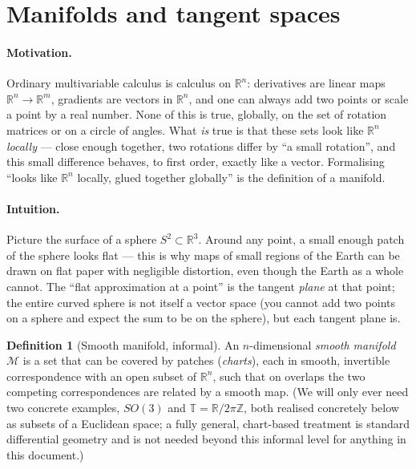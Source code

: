 \documentclass[11pt,a4paper]{report}
\theoremstyle{definition}
\newtheorem{definition}[definition]{Definition}
\theoremstyle{remark}
\newcommand{\RR}{\mathbb R}
\newcommand{\ZZ}{\mathbb Z}
\begin{document}
\section{Manifolds and tangent spaces}
\label{sec:manifolds-scratch}

\paragraph{Motivation.} Ordinary multivariable calculus is calculus on
$\RR^n$: derivatives are linear maps $\RR^n\to\RR^m$, gradients are vectors
in $\RR^n$, and one can always add two points or scale a point by a real
number. None of this is true, globally, on the set of rotation matrices or
on a circle of angles. What \emph{is} true is that these sets look like
$\RR^n$ \emph{locally} --- close enough together, two rotations differ by
``a small rotation'', and this small difference behaves, to first order,
exactly like a vector. Formalising ``looks like $\RR^n$ locally, glued
together globally'' is the definition of a manifold.

\paragraph{Intuition.} Picture the surface of a sphere $S^2\subset\RR^3$.
Around any point, a small enough patch of the sphere looks flat --- this is
why maps of small regions of the Earth can be drawn on flat paper with
negligible distortion, even though the Earth as a whole cannot. The
``flat approximation at a point'' is the tangent \emph{plane} at that point;
the entire curved sphere is not itself a vector space (you cannot add two
points on a sphere and expect the sum to be on the sphere), but each tangent
plane is.

\begin{definition}[Smooth manifold, informal]
\label{def:manifold-scratch}
An $n$-dimensional \emph{smooth manifold} $\mathcal M$ is a set that can be
covered by patches (\emph{charts}), each in smooth, invertible correspondence
with an open subset of $\RR^n$, such that on overlaps the two competing
correspondences are related by a smooth map. (We will only ever need two
concrete examples, $SO(3)$ and $\mathbb T=\RR/2\pi\ZZ$, both realised
concretely below as subsets of a Euclidean space; a fully general,
chart-based treatment is standard differential geometry and is not needed
beyond this informal level for anything in this document.)
\end{definition}
\end{document}
